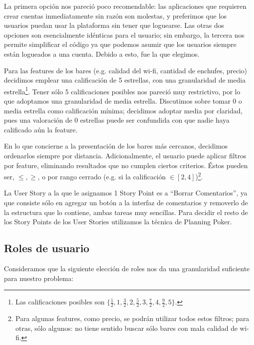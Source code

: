 \par La primera opción nos pareció poco recomendable: las aplicaciones que requieren crear cuentas inmediatamente sin razón son molestas, y preferimos que los usuarios puedan usar la plataforma sin tener que loguearse.
Las otras dos opciones son esencialmente idénticas para el usuario; sin embargo, la tercera nos permite simplificar el código ya que podemos asumir que los usuarios siempre están logueados a una cuenta. 
Debido a esto, fue la que elegimos.

\par Para las features de los bares (e.g. calidad del wi-fi, cantidad de enchufes, precio) decidimos emplear una calificación de 5 estrellas, con una granularidad de media estrella\footnote{Las calificaciones posibles son $\{ \frac{1}{2}, 1, \frac{3}{2}, 2, \frac{5}{2}, 3, \frac{7}{2}, 4, \frac{9}{2}, 5 \}$.}.
Tener sólo 5 calificaciones posibles nos pareció muy restrictivo, por lo que adoptamos una granularidad de media estrella.
Discutimos sobre tomar 0 o media estrella como calificación mínima; decidimos adoptar media por claridad, pues una valoración de 0 estrellas puede ser confundida con que nadie haya calificado aún la feature.

\par En lo que concierne a la presentación de los bares más cercanos, decidimos ordenarlos siempre por distancia.
Adicionalmente, el usuario puede aplicar filtros por feature, eliminando resultados que no cumplen ciertos criterios. 
Éstos pueden ser, $\leqslant, \geqslant$, o por rango cerrado (e.g. si la calificación $\in [2, 4]$)\footnote{Para algunas features, como precio, se podrán utilizar todos estos filtros; para otras, sólo algunos: no tiene sentido buscar sólo bares con mala calidad de wi-fi.}.

\par La User Story a la que le asignamos 1 Story Point es a ``Borrar Comentarios'', ya que consiste sólo en agregar un botón a la interfaz de comentarios y removerlo de la estructura que lo contiene, ambas tareas muy sencillas. Para decidir el resto de los Story Points de los User Stories utilizamos la técnica de Planning Poker.

\subsection{Roles de usuario}
\par Consideramos que la siguiente elección de roles nos da una granularidad suficiente para nuestro problema:

